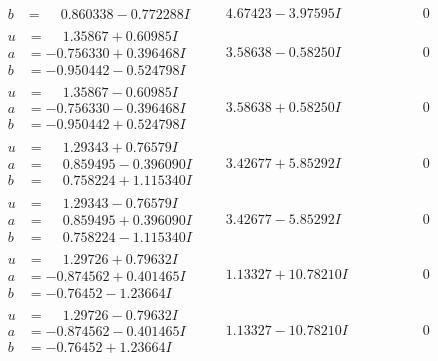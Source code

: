 \documentclass[1p]{elsarticle_modified}
\theoremstyle{definition}
\begin{document}
$$\begin{array}{c|c|c}
\begin{aligned}
b &= \phantom{-}0.860338 - 0.772288 I\end{aligned}
 & \phantom{-}4.67423 - 3.97595 I & \phantom{-0.000000 } 0 \\ \hline\begin{aligned}
u &= \phantom{-}1.35867 + 0.60985 I \\
a &= -0.756330 + 0.396468 I \\
b &= -0.950442 - 0.524798 I\end{aligned}
 & \phantom{-}3.58638 - 0.58250 I & \phantom{-0.000000 } 0 \\ \hline\begin{aligned}
u &= \phantom{-}1.35867 - 0.60985 I \\
a &= -0.756330 - 0.396468 I \\
b &= -0.950442 + 0.524798 I\end{aligned}
 & \phantom{-}3.58638 + 0.58250 I & \phantom{-0.000000 } 0 \\ \hline\begin{aligned}
u &= \phantom{-}1.29343 + 0.76579 I \\
a &= \phantom{-}0.859495 - 0.396090 I \\
b &= \phantom{-}0.758224 + 1.115340 I\end{aligned}
 & \phantom{-}3.42677 + 5.85292 I & \phantom{-0.000000 } 0 \\ \hline\begin{aligned}
u &= \phantom{-}1.29343 - 0.76579 I \\
a &= \phantom{-}0.859495 + 0.396090 I \\
b &= \phantom{-}0.758224 - 1.115340 I\end{aligned}
 & \phantom{-}3.42677 - 5.85292 I & \phantom{-0.000000 } 0 \\ \hline\begin{aligned}
u &= \phantom{-}1.29726 + 0.79632 I \\
a &= -0.874562 + 0.401465 I \\
b &= -0.76452 - 1.23664 I\end{aligned}
 & \phantom{-}1.13327 + 10.78210 I & \phantom{-0.000000 } 0 \\ \hline\begin{aligned}
u &= \phantom{-}1.29726 - 0.79632 I \\
a &= -0.874562 - 0.401465 I \\
b &= -0.76452 + 1.23664 I\end{aligned}
 & \phantom{-}1.13327 - 10.78210 I & \phantom{-0.000000 } 0 \\ \hline\begin{aligned}

\end{aligned}
\end{array}$$
\end{document}
